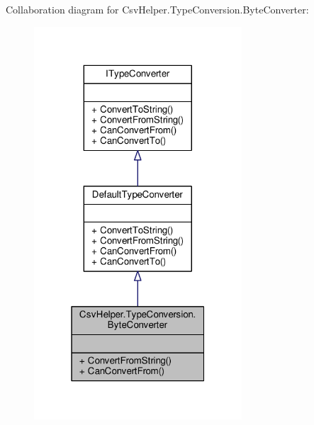 Collaboration diagram for Csv\-Helper.\-Type\-Conversion.\-Byte\-Converter\-:
\nopagebreak
\begin{figure}[H]
\begin{center}
\leavevmode
\includegraphics[width=220pt]{a00501}
\end{center}
\end{figure}
